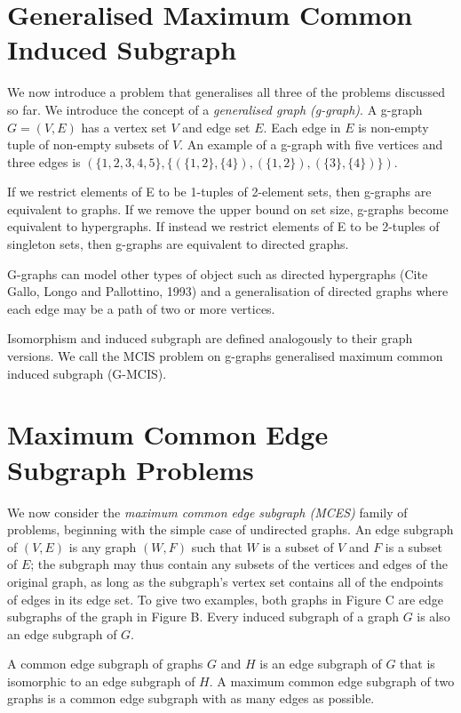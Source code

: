 \section{Generalised Maximum Common Induced Subgraph}

We now introduce a problem that generalises all three of the problems discussed
so far. We introduce the concept of a \emph{generalised graph (g-graph)}. A
g-graph $G = (V, E)$ has a vertex set $V$ and edge set $E$. Each edge in $E$ is
non-empty tuple of non-empty subsets of $V$. An example of a g-graph with five
vertices and three edges is $(\{1,2,3,4,5\}, \{(\{1,2\},\{4\}), (\{1,2\}), (\{3\},\{4\})\})$.

If we restrict elements of E to be 1-tuples of 2-element sets, then g-graphs
are equivalent to graphs. If we remove the upper bound on set size, g-graphs
become equivalent to hypergraphs. If instead we restrict elements of E to be
2-tuples of singleton sets, then g-graphs are equivalent to directed graphs.

G-graphs can model other types of object such as directed hypergraphs (Cite
Gallo, Longo and Pallottino, 1993) and a generalisation of directed graphs
where each edge may be a path of two or more vertices.

Isomorphism and induced subgraph are defined analogously to their graph
versions. We call the MCIS problem on g-graphs generalised maximum common
induced subgraph (G-MCIS).

\section{Maximum Common Edge Subgraph Problems}

We now consider the \emph{maximum common edge subgraph (MCES)} family of problems,
beginning with the simple case of undirected graphs. An edge subgraph of $(V, E)$
is any graph $(W, F)$ such that $W$ is a subset of $V$ and $F$ is a subset of $E$; the
subgraph may thus contain any subsets of the vertices and edges of the original
graph, as long as the subgraph’s vertex set contains all of the endpoints of
edges in its edge set. To give two examples, both graphs in Figure C are edge
subgraphs of the graph in Figure B. Every induced subgraph of a graph $G$ is also
an edge subgraph of $G$.

A common edge subgraph of graphs $G$ and $H$ is an edge subgraph of $G$ that is
isomorphic to an edge subgraph of $H$. A maximum common edge subgraph of two
graphs is a common edge subgraph with as many edges as possible.

